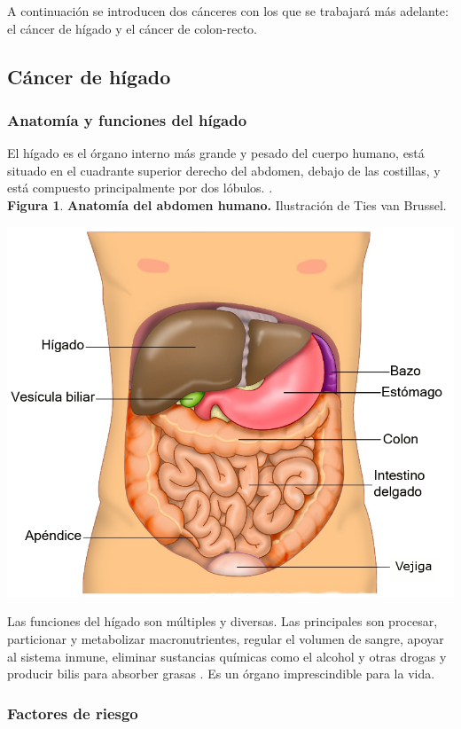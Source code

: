 A continuación se introducen dos cánceres con los que se trabajará más adelante: el cáncer de hígado y el cáncer de colon-recto.

\subsection{Cáncer de hígado}

\subsubsection{Anatomía y funciones del hígado}

El hígado es el órgano interno más grande y pesado del cuerpo humano, está situado en el cuadrante superior derecho del abdomen, debajo de las costillas, y está compuesto principalmente por dos lóbulos. \cite{Abdel-Misih2010}.\\

\textbf{Figura 1}. \textbf{Anatomía del abdomen humano.} Ilustración de Ties van Brussel.
\begin{center}
\includegraphics[width=.70\textwidth]{figuras/anatomia_higado.png} \\
\end{center}

Las funciones del hígado son múltiples y diversas. Las principales son procesar, particionar y metabolizar macronutrientes, regular el volumen de sangre, apoyar al sistema inmune, eliminar sustancias químicas como el alcohol y otras drogas y producir bilis para absorber grasas \cite{Trefts2017}. Es un órgano imprescindible para la vida.

\subsubsection{Factores de riesgo}

